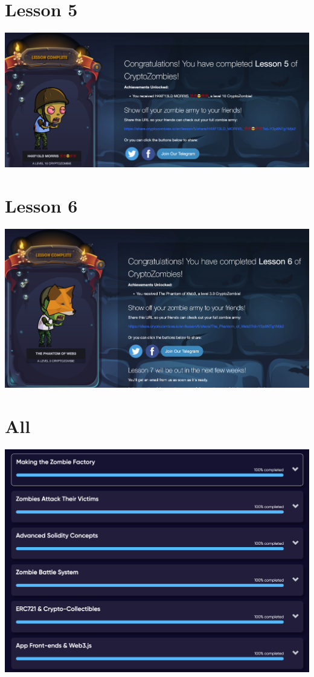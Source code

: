\documentclass[14pt,a4paper]{extarticle}
\begin{document}
	\section*{Lesson 5}
	\includegraphics[width=\textwidth]{images/lesson5.png}

	\section*{Lesson 6}
	\includegraphics[width=\textwidth]{images/lesson6.png}

	\section*{All}
	\includegraphics[width=\textwidth]{images/all.png}
\end{document}
